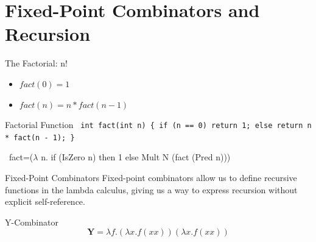 \documentclass{beamer}
\begin{document}
\section{Fixed-Point Combinators and Recursion}
\begin{frame}{The Factorial: n!}
  \begin{itemize}
    \item $fact(0)=1$
    \item $fact(n)=n*fact(n-1)$
  \end{itemize}
  \begin{block}{Factorial Function}
    \texttt{
      int fact(int n) \{ \newline
      \hspace*{1em}if (n == 0) return 1; \newline
      \hspace*{1em}else return n * fact(n - 1); \newline
      \}
    }
  \end{block}
  \begin{block}{}
    \ fact=($\lambda$ n. if (IsZero n) then 1 else Mult N (fact (Pred n))) \\
  \end{block}
\end{frame}
\begin{frame}{Fixed-Point Combinators}
  Fixed-point combinators allow us to define recursive functions in the lambda calculus, giving us a way to express recursion without explicit self-reference.
  \begin{block}{Y-Combinator}
    \[
    \mathbf{Y} = \lambda f. (\lambda x. f (x x)) (\lambda x. f (x x))
    \]
  \end{block}

\end{frame}
\end{document}
